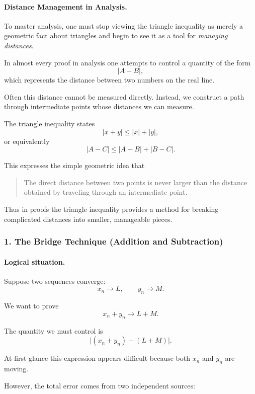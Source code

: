 \paragraph{Distance Management in Analysis.}

To master analysis, one must stop viewing the triangle inequality as
merely a geometric fact about triangles and begin to see it as a tool
for \emph{managing distances}.

In almost every proof in analysis one attempts to control a quantity of
the form
\[
|A - B|,
\]
which represents the distance between two numbers on the real line.

Often this distance cannot be measured directly. Instead, we construct
a path through intermediate points whose distances we can measure.

The triangle inequality states
\[
|x + y| \le |x| + |y|,
\]
or equivalently
\[
|A - C| \le |A - B| + |B - C|.
\]

This expresses the simple geometric idea that

\begin{quote}
The direct distance between two points is never larger than the
distance obtained by traveling through an intermediate point.
\end{quote}

Thus in proofs the triangle inequality provides a method for breaking
complicated distances into smaller, manageable pieces.

\bigskip

\subsubsection*{1. The Bridge Technique (Addition and Subtraction)}

\paragraph{Logical situation.}

Suppose two sequences converge:
\[
x_n \to L,
\qquad
y_n \to M.
\]

We want to prove
\[
x_n + y_n \to L + M.
\]

The quantity we must control is
\[
\bigl|(x_n + y_n) - (L + M)\bigr|.
\]

At first glance this expression appears difficult because both $x_n$
and $y_n$ are moving.

However, the total error comes from two independent sources:

